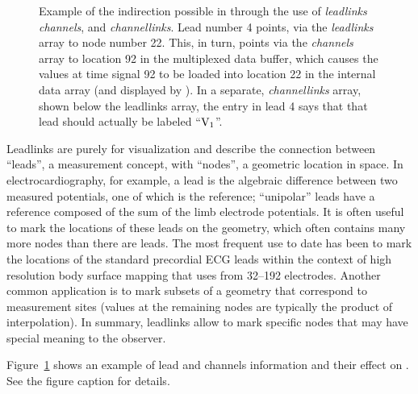 \begin{figure}[htb]
   \begin{makeimage}
    \end{makeimage}
    \indirec
    \caption{\label{fig:indirec}Example of the indirection possible in
      \map{} through the use of {\em leadlinks\/} {\em channels}, and {\em
        channellinks}.  Lead number 4 points, via the {\em leadlinks\/}
      array to node number 22.  This, in turn, points via the {\em
        channels\/} array to location 92 in the multiplexed data buffer,
      which causes the values at time signal 92 to be loaded into location
      22 in the internal data array (and displayed by \map{}).  In a
      separate, \emph{channellinks} array, shown below the leadlinks array,
      the entry in lead 4 says that that lead should actually be labeled
      ``${\rm V_{1}}$''. }
\end{figure}

Leadlinks are purely for visualization and describe the connection between
``leads'', a measurement concept, with ``nodes'', a geometric location in
space.  In electrocardiography, for example, a lead is the algebraic
difference between two measured potentials, one of which is the reference;
``unipolar'' leads have a reference composed of the sum of the limb
electrode potentials.  It is often useful to mark the locations of these
leads on the geometry, which often contains many more nodes than there are
leads.  The most frequent use to date has been to mark the locations of the
standard precordial ECG leads within the context of high resolution body
surface mapping that uses from 32--192 electrodes.  Another common
application is to mark subsets of a geometry that correspond to 
measurement sites (values at the remaining nodes are typically the product
of interpolation).  In summary, leadlinks allow \map{} to mark specific
nodes that may have special meaning to the observer.

Figure~\ref{fig:indirec} shows an example of lead and channels
information and their effect on \map{}.  See the figure caption for
details. 


